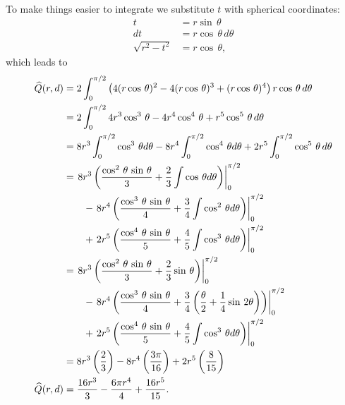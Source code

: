 To make things easier to integrate we substitute $t$ with spherical coordinates:
\begin{align*}
t  &= r \sin \, \theta \\
dt &= r \cos \, \theta \, d\theta \\
\sqrt{r^2 - t^2} &= r \cos \, \theta
\text{,}
\end{align*}
which leads to
\begin{align*}
\widehat{Q}(r,d) &= 2 \int_{0}^{\pi/2}
          \left(4(r\cos\,\theta)^2 
              - 4(r\cos\,\theta)^3 
              + (r\cos\,\theta)^4
          \right)
        r\cos\,\theta\,d\theta \\
     &= 2 \int_{0}^{\pi/2}
          4r^3\cos^3\,\theta 
        - 4r^4\cos^4\,\theta 
        + r^5\cos^5\,\theta \, d\theta \\
     &= 8r^3 \int_{0}^{\pi/2} \cos^3\,\theta d\theta
      - 8r^4 \int_{0}^{\pi/2} \cos^4\,\theta d\theta
      + 2r^5 \int_{0}^{\pi/2} \cos^5\,\theta \, d\theta \\
     &= \left. 8r^3 \left(
            \frac{\cos^2\,\theta\,\sin\,\theta}{3}
          + \frac{2}{3} \int \cos\,\theta d\theta \right)
        \right|_{0}^{\pi/2} \\
     &\qquad 
      - \left. 8r^4 \left(
            \frac{\cos^3\,\theta\,\sin\,\theta}{4}
          + \frac{3}{4} \int \cos^2\,\theta d\theta \right)
        \right|_{0}^{\pi/2} \\
     &\qquad
       + \left. 2r^5 \left(
            \frac{\cos^4\,\theta\,\sin\,\theta}{5}
          + \frac{4}{5} \int \cos^3\,\theta d\theta \right)
        \right|_{0}^{\pi/2} \\
     &= \left. 8r^3 \left(
            \frac{\cos^2\,\theta\,\sin\,\theta}{3}
          + \frac{2}{3} \sin\,\theta \right)
        \right|_{0}^{\pi/2} \\
     &\qquad
       - \left. 8r^4 \left(
            \frac{\cos^3\,\theta\,\sin\,\theta}{4}
          + \frac{3}{4} \left(
                \frac{\theta}{2}
              + \frac{1}{4} \sin\,2\theta \right)
            \right)
        \right|_{0}^{\pi/2} \\
     &\qquad
       + \left. 2r^5 \left(
            \frac{\cos^4\,\theta\,\sin\,\theta}{5}
          + \frac{4}{5} \int \cos^3\,\theta d\theta \right)
        \right|_{0}^{\pi/2} \\
     &= 8r^3 \left(\frac{2}{3}\right)
      - 8r^4 \left(\frac{3\pi}{16}\right)
      + 2r^5 \left(\frac{8}{15} \right) \\
\widehat{Q}(r,d) &= \frac{16r^3}{3} - \frac{6\pi r^4}{4} + \frac{16r^5}{15}
\text{.}
\end{align*}


